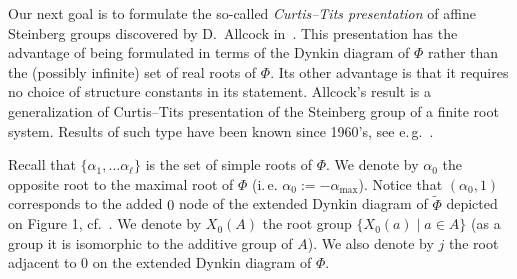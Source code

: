 Our next goal is to formulate the so-called \textit{Curtis--Tits presentation} of affine Steinberg groups discovered by D.~Allcock in~\cite{A16, A13}.
This presentation has the advantage of being formulated in terms of the Dynkin diagram of $\Phi$ rather than the (possibly infinite) set of real roots of $\Phi$.
Its other advantage is that it requires no choice of structure constants in its statement.
Allcock's result is a generalization of Curtis--Tits presentation of the Steinberg group of a finite root system.
Results of such type have been known since 1960's, see e.\,g.~\cite[Theorem~B]{DS74}.

Recall that $\{ \alpha_1, \ldots \alpha_\ell \}$ is the set of simple roots of $\Phi$.
We denote by $\alpha_0$ the opposite root to the maximal root of $\Phi$ (i.\,e. $\alpha_0 := -\alpha_\mathrm{max}$).
Notice that $(\alpha_0, 1)$ corresponds to the added $0$ node of the extended Dynkin diagram of $\widetilde{\Phi}$ depicted on Figure 1, cf.~\cite[\S~4]{A16}.
We denote by $X_0(A)$ the root group $\{ X_0(a) \mid a \in A\}$ (as a group it is isomorphic to the additive group of $A$).
We also denote by $j$ the root adjacent to $0$ on the extended Dynkin diagram of $\Phi$.

